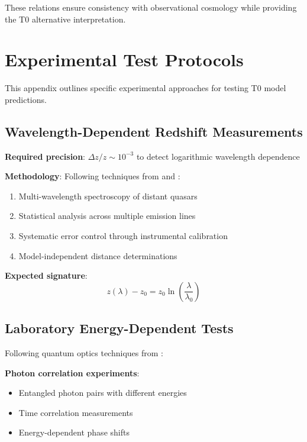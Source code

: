\documentclass[12pt,a4paper]{article}
\begin{document}
	These relations ensure consistency with observational cosmology while providing the T0 alternative interpretation.
	
	\section{Experimental Test Protocols}
	\label{app:experimental_protocols}
	
	This appendix outlines specific experimental approaches for testing T0 model predictions.
	
	\subsection{Wavelength-Dependent Redshift Measurements}
	\label{app:redshift_measurements}
	
	\textbf{Required precision}: $\Delta z/z \sim 10^{-3}$ to detect logarithmic wavelength dependence
	
	\textbf{Methodology}: Following techniques from \citet{murphy2003} and \citet{uzan2003}:
	\begin{enumerate}
		\item Multi-wavelength spectroscopy of distant quasars
		\item Statistical analysis across multiple emission lines
		\item Systematic error control through instrumental calibration
		\item Model-independent distance determinations
	\end{enumerate}
	
	\textbf{Expected signature}: 
	\begin{equation}
		z(\lambda) - z_0 = z_0 \ln\left(\frac{\lambda}{\lambda_0}\right)
	\end{equation}
	
	\subsection{Laboratory Energy-Dependent Tests}
	\label{app:laboratory_tests}
	
	Following quantum optics techniques from \citet{scully1997}:
	
	\textbf{Photon correlation experiments}:
	\begin{itemize}
		\item Entangled photon pairs with different energies
		\item Time correlation measurements
		\item Energy-dependent phase shifts
	\end{itemize}
	
\end{document}

